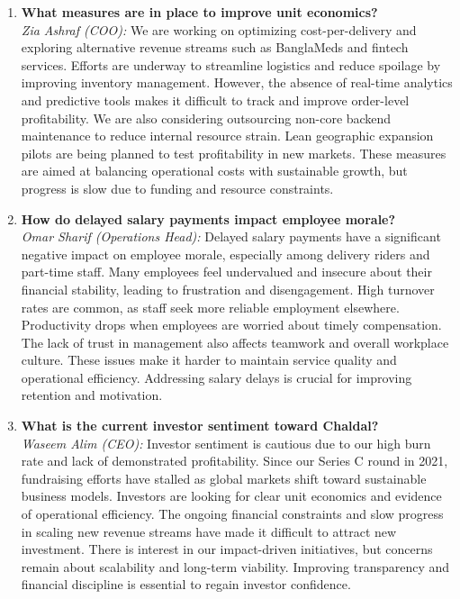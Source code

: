 \documentclass[12pt,a4paper]{article}
\begin{document}
\begin{enumerate}
        \item \textbf{What measures are in place to improve unit economics?} \\
        \textit{Zia Ashraf (COO):} We are working on optimizing cost-per-delivery and exploring alternative revenue streams such as BanglaMeds and fintech services. Efforts are underway to streamline logistics and reduce spoilage by improving inventory management. However, the absence of real-time analytics and predictive tools makes it difficult to track and improve order-level profitability. We are also considering outsourcing non-core backend maintenance to reduce internal resource strain. Lean geographic expansion pilots are being planned to test profitability in new markets. These measures are aimed at balancing operational costs with sustainable growth, but progress is slow due to funding and resource constraints.

        \item \textbf{How do delayed salary payments impact employee morale?} \\
        \textit{Omar Sharif (Operations Head):} Delayed salary payments have a significant negative impact on employee morale, especially among delivery riders and part-time staff. Many employees feel undervalued and insecure about their financial stability, leading to frustration and disengagement. High turnover rates are common, as staff seek more reliable employment elsewhere. Productivity drops when employees are worried about timely compensation. The lack of trust in management also affects teamwork and overall workplace culture. These issues make it harder to maintain service quality and operational efficiency. Addressing salary delays is crucial for improving retention and motivation.

        \item \textbf{What is the current investor sentiment toward Chaldal?} \\
        \textit{Waseem Alim (CEO):} Investor sentiment is cautious due to our high burn rate and lack of demonstrated profitability. Since our Series C round in 2021, fundraising efforts have stalled as global markets shift toward sustainable business models. Investors are looking for clear unit economics and evidence of operational efficiency. The ongoing financial constraints and slow progress in scaling new revenue streams have made it difficult to attract new investment. There is interest in our impact-driven initiatives, but concerns remain about scalability and long-term viability. Improving transparency and financial discipline is essential to regain investor confidence.


\end{enumerate}
\end{document}
